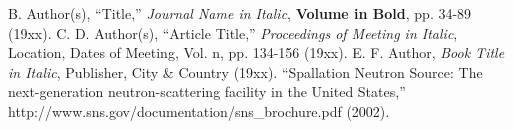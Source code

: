 \documentclass{mc2013}
\begin{document}
\setlength{\baselineskip}{12pt}
\begin{thebibliography}{300}
 B. Author(s), ``Title,'' {\it Journal Name in Italic}, 
          {\bf Volume in Bold}, pp. 34-89 (19xx).
 C. D. Author(s), ``Article Title,'' {\it Proceedings of
          Meeting in Italic}, Location, Dates of Meeting, Vol. n, pp. 134-156 
          (19xx).
 E. F. Author, {\it Book Title in Italic}, Publisher, City \&
          Country (19xx). 
 ``Spallation Neutron Source: The next-generation 
          neutron-scattering facility in the United States,'' 
          http://www.sns.gov/documentation/sns\_brochure.pdf (2002).
\end{thebibliography}
\end{document}

